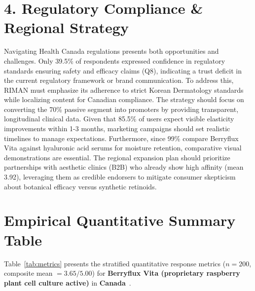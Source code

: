 \documentclass[10pt,twocolumn,a4paper]{article}
\begin{document}
\section{4. Regulatory Compliance \& Regional Strategy}
Navigating Health Canada regulations presents both opportunities and challenges. Only 39.5\% of respondents expressed confidence in regulatory standards ensuring safety and efficacy claims (Q8), indicating a trust deficit in the current regulatory framework or brand communication. To address this, RIMAN must emphasize its adherence to strict Korean Dermatology standards while localizing content for Canadian compliance. The strategy should focus on converting the 70\% passive segment into promoters by providing transparent, longitudinal clinical data. Given that 85.5\% of users expect visible elasticity improvements within 1-3 months, marketing campaigns should set realistic timelines to manage expectations. Furthermore, since 99\% compare Berryflux Vita against hyaluronic acid serums for moisture retention, comparative visual demonstrations are essential. The regional expansion plan should prioritize partnerships with aesthetic clinics (B2B) who already show high affinity (mean 3.92), leveraging them as credible endorsers to mitigate consumer skepticism about botanical efficacy versus synthetic retinoids.


\section{Empirical Quantitative Summary Table}
Table~\ref{tab:metrics} presents the stratified quantitative response metrics ($n = 200$, composite mean $= 3.65/5.00$) for \textbf{Berryflux Vita (proprietary raspberry plant cell culture active)} in \textbf{Canada}~\cite{ref_kaggle_doi,ref_hf_doi}.
\end{document}
